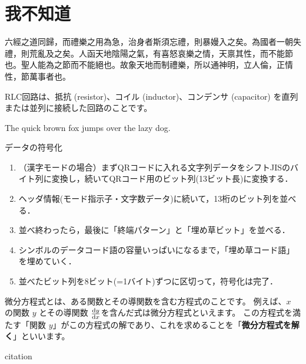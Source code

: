 \section{我不知道}

六經之道同歸，而禮樂之用為急，治身者斯須忘禮，則暴嫚入之矣。為國者一朝失禮，則荒亂及之矣。人函天地陰陽之氣，有喜怒哀樂之情，天禀其性，而不能節也。聖人能為之節而不能絕也。故象天地而制禮樂，所以通神明，立人倫，正情性，節萬事者也。

RLC回路は、抵抗 (resistor)、コイル (inductor)、コンデンサ (capacitor) を直列または並列に接続した回路のことです。

The quick brown fox jumps over the lazy dog.

データの符号化
\begin{enumerate}
	\item （漢字モードの場合）まずQRコードに入れる文字列データをシフトJISのバイト列に変換し，続いてQRコード用のビット列(13ビット長)に変換する．
	\item ヘッダ情報(モード指示子・文字数データ)に続いて，13桁のビット列を並べる．
	\item 並べ終わったら，最後に「終端パターン」と「埋め草ビット」を並べる．
	\item シンボルのデータコード語の容量いっぱいになるまで，「埋め草コード語」を埋めていく．
	\item 並べたビット列を8ビット(=1バイト)ずつに区切って，符号化は完了．
\end{enumerate}

微分方程式とは、ある関数とその導関数を含む方程式のことです。
例えば、\(x\) の関数 \(y\) とその導関数 \(\dv{y}{x}\)を含んだ式は微分方程式といえます。
この方程式を満たす「関数 \(y\)」がこの方程式の解であり、これを求めることを「\textbf{微分方程式を解く}」といいます。

citation \cite{sizesuu}
